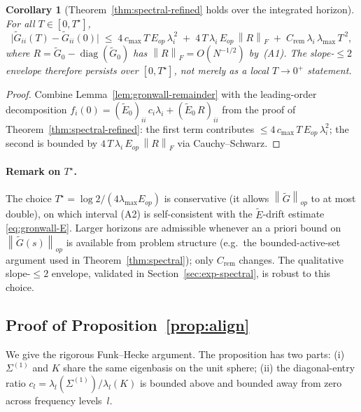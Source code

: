 \documentclass{article}
\newtheorem{corollary}[theorem]{Corollary}
\DeclareMathOperator{\diag}{diag}
\newcommand{\norm}[1]{\left\|#1\right\|}
\newcommand{\E}{E}
\newcommand{\Gtilde}{\widetilde{G}}
\newcommand{\Etilde}{\widetilde{\E}}
\begin{document}
\begin{corollary}[Theorem~\ref{thm:spectral-refined} holds over the
integrated horizon]
\label{cor:gronwall}
For all $T \in [0, T^\star]$,
\[
\bigl|\Gtilde_{ii}(T) - \Gtilde_{ii}(0)\bigr|
\;\leq\; 4\,c_{\max}\,T\,E_{op}\,\lambda_i^{\,2}
\;+\; 4\,T\,\lambda_i\,E_{op}\,\norm{R}_F
\;+\; C_{\mathrm{rem}}\,\lambda_i\,\lambda_{\max}\, T^{\,2},
\]
where $R = \Gtilde_0 - \diag(\Gtilde_0)$ has $\norm{R}_F = O(N^{-1/2})$
by~(A1). The slope-$\leq 2$ envelope therefore persists over $[0, T^\star]$,
not merely as a local $T \to 0^+$ statement.
\end{corollary}

\begin{proof}
Combine Lemma~\ref{lem:gronwall-remainder} with the leading-order
decomposition $f_i(0) = (\Etilde_0)_{ii}\,c_i \lambda_i +
(\Etilde_0\,R)_{ii}$ from the proof of
Theorem~\ref{thm:spectral-refined}: the first term contributes
$\leq 4\,c_{\max}\,T\,E_{op}\,\lambda_i^2$; the second is bounded by
$4\,T\,\lambda_i\,E_{op}\,\norm{R}_F$ via Cauchy--Schwarz.
\end{proof}

\paragraph{Remark on $T^\star$.}
The choice $T^\star = \log 2 / (4\lambda_{\max} E_{op})$ is conservative
(it allows $\norm{\Gtilde}_{op}$ to at most double), on which interval
(A2) is self-consistent with the $\Etilde$-drift estimate
\eqref{eq:gronwall-E}. Larger horizons are admissible whenever an a
priori bound on $\norm{\Gtilde(s)}_{op}$ is available from problem
structure (e.g.\ the bounded-active-set argument used in
Theorem~\ref{thm:spectral}); only $C_{\mathrm{rem}}$ changes. The
qualitative slope-$\leq 2$ envelope, validated in
Section~\ref{sec:exp-spectral}, is robust to this choice.

\subsection{Proof of Proposition~\ref{prop:align}}
\label{app:prop-align}

We give the rigorous Funk--Hecke argument. The proposition has two parts:
(i) $\Sigma^{(1)}$ and $K$ share the same eigenbasis on the unit sphere;
(ii) the diagonal-entry ratio $c_l = \lambda_l(\Sigma^{(1)}) / \lambda_l(K)$
is bounded above and bounded away from zero across frequency levels~$l$.
\end{document}
